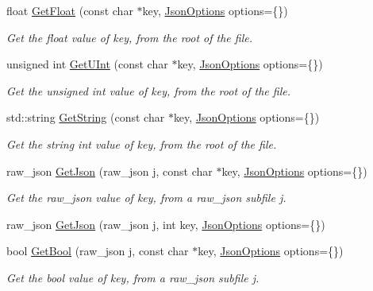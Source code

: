 \begin{DoxyCompactItemize}
float \hyperlink{classTarbora_1_1Json_ac537db65e750364c0de9749bd19caf06}{Get\+Float} (const char $\ast$key, \hyperlink{structTarbora_1_1JsonOptions}{Json\+Options} options=\{\})
\begin{DoxyCompactList}\small\item\em Get the float value of {\itshape key}, from the root of the file. \end{DoxyCompactList}\item 
unsigned int \hyperlink{classTarbora_1_1Json_a875c7af2f8461cd1c05c68b683610c4f}{Get\+U\+Int} (const char $\ast$key, \hyperlink{structTarbora_1_1JsonOptions}{Json\+Options} options=\{\})
\begin{DoxyCompactList}\small\item\em Get the unsigned int value of {\itshape key}, from the root of the file. \end{DoxyCompactList}\item 
std\+::string \hyperlink{classTarbora_1_1Json_a0d99980482afa0e1f51ff5603d626335}{Get\+String} (const char $\ast$key, \hyperlink{structTarbora_1_1JsonOptions}{Json\+Options} options=\{\})
\begin{DoxyCompactList}\small\item\em Get the string int value of {\itshape key}, from the root of the file. \end{DoxyCompactList}\item 
raw\+\_\+json \hyperlink{classTarbora_1_1Json_a46aeffce57fb2925471f82c7c4638b12}{Get\+Json} (raw\+\_\+json j, const char $\ast$key, \hyperlink{structTarbora_1_1JsonOptions}{Json\+Options} options=\{\})
\begin{DoxyCompactList}\small\item\em Get the raw\+\_\+json value of {\itshape key}, from a raw\+\_\+json subfile {\itshape j}. \end{DoxyCompactList}\item 
raw\+\_\+json \hyperlink{classTarbora_1_1Json_a6f7c9943589e6b5c831f1515bb65d339}{Get\+Json} (raw\+\_\+json j, int key, \hyperlink{structTarbora_1_1JsonOptions}{Json\+Options} options=\{\})
\item 
bool \hyperlink{classTarbora_1_1Json_aafdb382885bafbe2b00da49dc685ab25}{Get\+Bool} (raw\+\_\+json j, const char $\ast$key, \hyperlink{structTarbora_1_1JsonOptions}{Json\+Options} options=\{\})
\begin{DoxyCompactList}\small\item\em Get the bool value of {\itshape key}, from a raw\+\_\+json subfile {\itshape j}. \end{DoxyCompactList}\item 

\end{DoxyCompactItemize}
